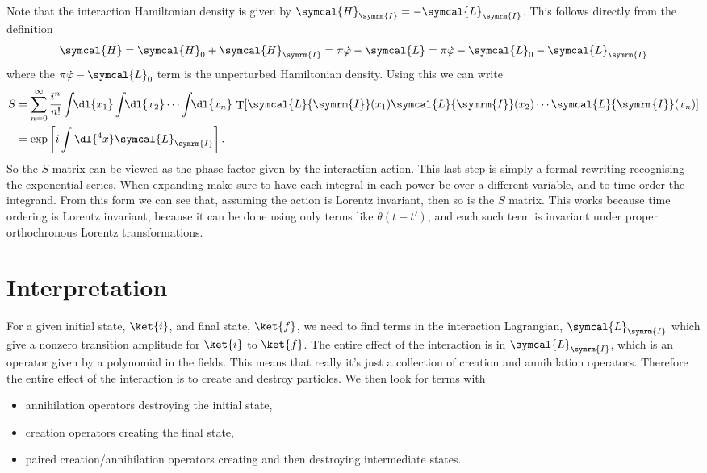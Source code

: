 \documentclass[fleqn]{NotesClass}
\newcommand{\lagrangianDensity}{\symcal{L}}
\newcommand{\hamiltonianDensity}{\symcal{H}}
\newcommand{\interaction}{\symrm{I}}
\newcommand{\heaviside}{\theta}
\DeclareMathOperator{\timeOrdering}{T}
\begin{document}
    Note that the interaction Hamiltonian density is given by \(\hamiltonianDensity_{\interaction} = -\lagrangianDensity_{\interaction}\).
    This follows directly from the definition
    \begin{equation}
        \hamiltonianDensity = \hamiltonianDensity_0 + \hamiltonianDensity_{\interaction} = \pi \dot{\varphi} - \lagrangianDensity = \pi \dot{\varphi} - \lagrangianDensity_0 - \lagrangianDensity_{\interaction}
    \end{equation}
    where the \(\pi\dot{\varphi} - \lagrangianDensity_0\) term is the unperturbed Hamiltonian density.
    Using this we can write
    \begin{align}
        S &= \sum_{n = 0}^{\infty} \frac{i^n}{n!} \int \!\! \dl{x_1} \int \!\! \dl{x_2} \dotsm \int \!\! \dl{x_n} \, \timeOrdering[\lagrangianDensity{\interaction}(x_1) \lagrangianDensity{\interaction}(x_2) \dotsm \lagrangianDensity{\interaction}(x_n)]\\
        &= \exp\left[ i\int \dl{^4x} \lagrangianDensity_{\interaction} \right].
    \end{align}
    So the \(S\) matrix can be viewed as the phase factor given by the interaction action.
    This last step is simply a formal rewriting recognising the exponential series.
    When expanding make sure to have each integral in each power be over a different variable, and to time order the integrand.
    From this form we can see that, assuming the action is Lorentz invariant, then so is the \(S\) matrix.
    This works because time ordering is Lorentz invariant, because it can be done using only terms like \(\heaviside(t - t')\), and each such term is invariant under proper orthochronous Lorentz transformations.
    
    \section{Interpretation}
    For a given initial state, \(\ket{i}\), and final state, \(\ket{f}\), we need to find terms in the interaction Lagrangian, \(\lagrangianDensity_{\interaction}\) which give a nonzero transition amplitude for \(\ket{i}\) to \(\ket{f}\).
    The entire effect of the interaction is in \(\lagrangianDensity_{\interaction}\), which is an operator given by a polynomial in the fields.
    This means that really it's just a collection of creation and annihilation operators.
    Therefore the entire effect of the interaction is to create and destroy particles.
    We then look for terms with
    \begin{itemize}
        \item annihilation operators destroying the initial state,
        \item creation operators creating the final state,
        \item paired creation/annihilation operators creating and then destroying intermediate states.
    \end{itemize}
\end{document}
